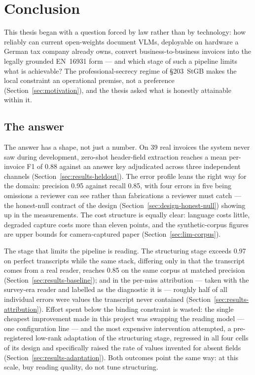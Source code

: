 \chapter{Conclusion}
\label{ch:conclusion}


This thesis began with a question forced by law rather than by technology: how reliably
can current open-weights document \acp{VLM}, deployable on hardware a German tax
company already owns, convert business-to-business invoices into the legally grounded
\ac{EN}~16931 form --- and which stage of such a pipeline limits what is achievable? The
professional-secrecy regime of \S203~\ac{StGB} makes the local constraint an operational
premise, not a preference (Section~\ref{sec:motivation}), and the thesis asked what is
honestly attainable within it.

\section*{The answer}

The answer has a shape, not just a number. On 39 real invoices the system never saw
during development, zero-shot header-field extraction reaches a mean per-invoice
\ac{F1} of 0.88 against an answer key adjudicated across three independent channels
(Section~\ref{sec:results-heldout}). The error profile leans the right way for the domain:
precision 0.95 against recall 0.85, with four errors in five being omissions a reviewer
can see rather than fabrications a reviewer must catch --- the honest-null contract of
the design (Section~\ref{sec:design-honest-null}) showing up in the measurements. The cost
structure is equally clear: language costs little, degraded capture costs more than
eleven points, and the synthetic-corpus figures are upper bounds for camera-captured
paper (Section~\ref{sec:lim-corpus}).

The stage that limits the pipeline is reading. The structuring stage exceeds 0.97 on
perfect transcripts while the same stack, differing only in that the transcript
comes from a real reader, reaches 0.85 on the same corpus at matched precision
(Section~\ref{sec:results-baseline}); and in the per-miss attribution --- taken with the
survey-era reader and labelled as the diagnostic it is --- roughly half of all
individual errors were values the transcript never contained
(Section~\ref{sec:results-attribution}). Effort spent
below the binding constraint is wasted: the single cheapest improvement made in this
project was swapping the reading model --- one configuration line --- and the most
expensive intervention attempted, a pre-registered low-rank adaptation of the
structuring stage, regressed in all four cells of its design and specifically raised
the rate of values invented for absent fields (Section~\ref{sec:results-adaptation}).
Both outcomes point the same way: at this scale, buy reading quality, do not tune
structuring.

